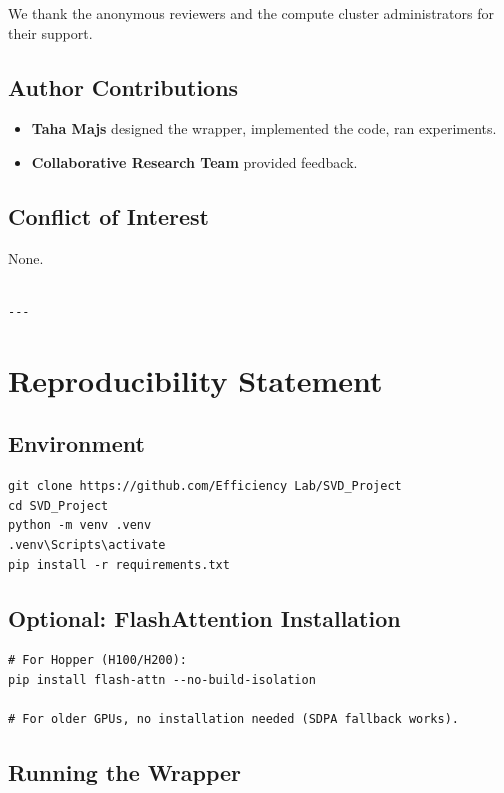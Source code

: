 We thank the anonymous reviewers and the compute cluster administrators for their support.

\subsection{Author Contributions}

\begin{itemize}
\item \textbf{Taha Majs} designed the wrapper, implemented the code, ran experiments.
\item \textbf{Collaborative Research Team} provided feedback.

\end{itemize}
\subsection{Conflict of Interest}

None.
\begin{lstlisting}

---
\end{lstlisting}

\section{Reproducibility Statement}

\subsection{Environment}

\begin{lstlisting}
git clone https://github.com/Efficiency Lab/SVD_Project
cd SVD_Project
python -m venv .venv
.venv\Scripts\activate
pip install -r requirements.txt
\end{lstlisting}

\subsection{Optional: FlashAttention Installation}

\begin{lstlisting}
# For Hopper (H100/H200):
pip install flash-attn --no-build-isolation

# For older GPUs, no installation needed (SDPA fallback works).
\end{lstlisting}

\subsection{Running the Wrapper}


